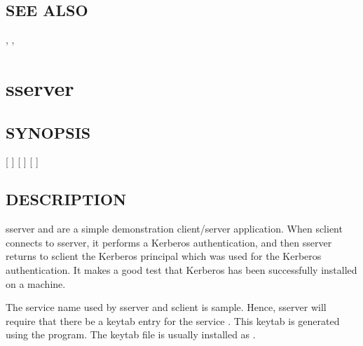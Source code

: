 \documentclass[letterpaper,10pt,english]{sphinxmanual}
\begin{document}
\subsection{SEE ALSO}
\label{\detokenize{admin/admin_commands/k5srvutil:see-also}}
\sphinxAtStartPar
{\hyperref[\detokenize{admin/admin_commands/kadmin_local:kadmin-1}]{}}, {\hyperref[\detokenize{admin/admin_commands/ktutil:ktutil-1}]{}}, 

\sphinxstepscope


\section{sserver}
\label{\detokenize{admin/admin_commands/sserver:sserver}}\label{\detokenize{admin/admin_commands/sserver:sserver-8}}\label{\detokenize{admin/admin_commands/sserver::doc}}

\subsection{SYNOPSIS}
\label{\detokenize{admin/admin_commands/sserver:synopsis}}
\sphinxAtStartPar
{}
{[}   {]}
{[}   {]}
{[}  {]}


\subsection{DESCRIPTION}
\label{\detokenize{admin/admin_commands/sserver:description}}
\sphinxAtStartPar
sserver and  are a simple demonstration client/server
application.  When sclient connects to sserver, it performs a Kerberos
authentication, and then sserver returns to sclient the Kerberos
principal which was used for the Kerberos authentication.  It makes a
good test that Kerberos has been successfully installed on a machine.

\sphinxAtStartPar
The service name used by sserver and sclient is sample.  Hence,
sserver will require that there be a keytab entry for the service
.  This keytab is generated
using the {\hyperref[\detokenize{admin/admin_commands/kadmin_local:kadmin-1}]{}} program.  The keytab file is usually
installed as {\hyperref[\detokenize{mitK5defaults:paths}]{}}.
\end{document}
